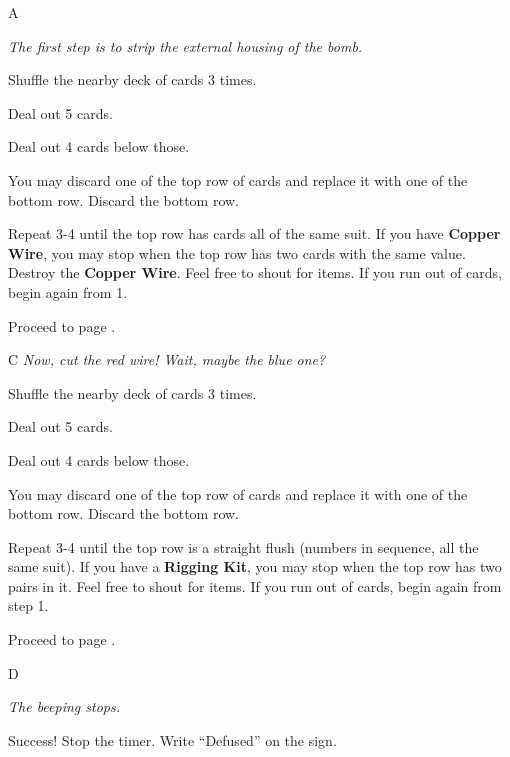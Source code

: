 \documentclass[GreenNotebook]{guildcamp3} %
\begin{document}
\begin{page}{A}
	
	{\it The first step is to strip the external housing of the bomb.}
	
	\begin{enum}
		\item Shuffle the nearby deck of cards 3 times. 
		\item Deal out 5 cards.
		\item Deal out 4 cards below those.
		\item You may discard one of the top row of cards and replace it with one of the bottom row. Discard the bottom row.
		\item Repeat 3-4 until the top row has cards all of the same suit. If you have {\bf Copper Wire}, you may stop when the top row has two cards with the same value. Destroy the {\bf Copper Wire}. Feel free to shout for items. If you run out of cards, begin again from 1. 
		\item Proceed to page .
	\end{enum}
	
\end{page}



\begin{page}{C}
	{\it Now, cut the red wire! Wait, maybe the blue one?}
	
	\begin{enum}
		\item Shuffle the nearby deck of cards 3 times. 
		\item Deal out 5 cards.
		\item Deal out 4 cards below those.
		\item You may discard one of the top row of cards and replace it with one of the bottom row. Discard the bottom row.
		\item Repeat 3-4 until the top row is a straight flush (numbers in sequence, all the same suit). If you have a {\bf Rigging Kit}, you may stop when the top row has two pairs in it. Feel free to shout for items. If you run out of cards, begin again from step 1. 
		\item Proceed to page \nbref{D}.
	\end{enum}
	
	
\end{page}



\begin{page}{D}
	
	{\it The beeping stops.}
	
	Success! Stop the timer. Write ``Defused'' on the sign. 
	
\end{page}

\endnotebook
\end{document}
